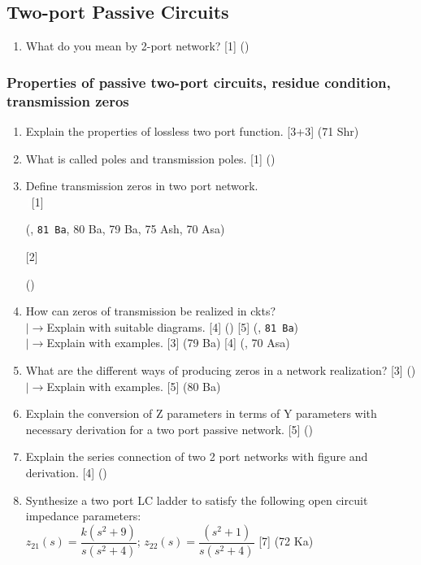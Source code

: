 \documentclass[12pt]{article}
\newcommand{\lb}{\\$\left|\rightarrow\right.$}
\newcommand{\enter}{\\\textcolor{white}{1}}
\begin{document}
	\subsection{Two-port Passive Circuits}
		\begin{enumerate}[noitemsep, topsep=0pt]
			\item What do you mean by 2-port network? \hfill [1] () 
		\end{enumerate}

		\subsubsection{Properties of passive two-port circuits, residue condition, transmission zeros}
			\begin{enumerate}[noitemsep, topsep=0pt]
				\item Explain the properties of lossless two port function. \hfill [3+3] (71 Shr)

				\item What is called poles and transmission poles. \hfill [1] ()

				\item Define transmission zeros in two port network.
				\enter\hfill [1] \begin{footnotesize}(, \texttt{81 Ba}, 80 Ba, 79 Ba, 75 Ash, 70 Asa)\end{footnotesize} [2] \begin{footnotesize}()\end{footnotesize}
				
				\item How can zeros of transmission be realized in ckts?
				\lb Explain with suitable diagrams. \hfill [4] () [5] (, \texttt{81 Ba})
				\lb Explain with examples. \hfill [3] (79 Ba) [4] (, 70 Asa)
				
				\item What are the different ways of producing zeros in a network realization? \hfill [3] ()
				\lb Explain with examples. \hfill [5] (80 Ba)

				\item Explain the conversion of Z parameters in terms of Y parameters with necessary derivation for a two port passive network. \hfill [5] ()	
				
				\item Explain the series connection of two 2 port networks with figure and derivation. \hfill [4] ()
				
				\item Synthesize a two port LC ladder to satisfy the following open circuit impedance parameters:\\ $z_{21}(s) = \dfrac{k(s^2+9)}{s(s^2+4)}$; \hspace{3.5cm} $z_{22}(s) = \dfrac{(s^2+1)}{s(s^2+4)}$ \hfill [7] (72 Ka)
			\end{enumerate}
\end{document}
